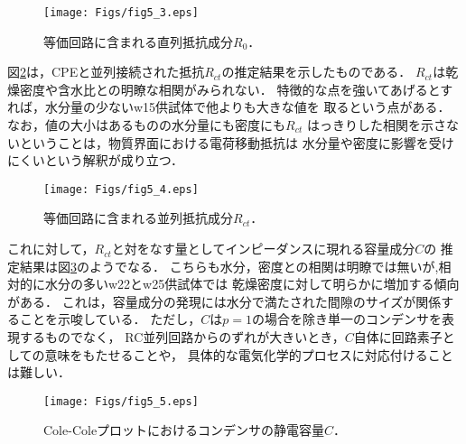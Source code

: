 \begin{figure}[h]
	\begin{center}
	\texttt{[image: Figs/fig5\_3.eps]} 
	\end{center}
	\caption{
		等価回路に含まれる直列抵抗成分$R_0$．
	} 
	\label{fig:fig5_3}
\end{figure}
図\ref{fig:fig5_4}は，CPEと並列接続された抵抗$R_{ct}$の推定結果を示したものである．
$R_{ct}$は乾燥密度や含水比との明瞭な相関がみられない．
特徴的な点を強いてあげるとすれば，水分量の少ないw15供試体で他よりも大きな値を
取るという点がある．なお，値の大小はあるものの水分量にも密度にも$R_{ct}$
はっきりした相関を示さないということは，物質界面における電荷移動抵抗は
水分量や密度に影響を受けにくいという解釈が成り立つ．
\begin{figure}[h]
	\begin{center}
	\texttt{[image: Figs/fig5\_4.eps]} 
	\end{center}
	\caption{
		等価回路に含まれる並列抵抗成分$R_{ct}$．
	} 
	\label{fig:fig5_4}
\end{figure}
これに対して，$R_{ct}$と対をなす量としてインピーダンスに現れる容量成分$C$の
推定結果は図\ref{fig:fig5_5}のようでなる．
こちらも水分，密度との相関は明瞭では無いが,相対的に水分の多いw22とw25供試体では
乾燥密度に対して明らかに増加する傾向がある．
これは，容量成分の発現には水分で満たされた間隙のサイズが関係することを示唆している．
ただし，$C$は$p=1$の場合を除き単一のコンデンサを表現するものでなく，
RC並列回路からのずれが大きいとき，$C$自体に回路素子としての意味をもたせることや，
具体的な電気化学的プロセスに対応付けることは難しい．\\
\begin{figure}[h]
	\begin{center}
	\texttt{[image: Figs/fig5\_5.eps]} 
	\end{center}
	\caption{
		Cole-Coleプロットにおけるコンデンサの静電容量$C$．
	} 
	\label{fig:fig5_5}
\end{figure}

